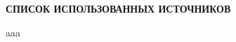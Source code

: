 \begin{center}
	{\bfseries\large СПИСОК ИСПОЛЬЗОВАННЫХ ИСТОЧНИКОВ}
\end{center}

\begingroup
\renewcommand{\section}[2]{}
\begin{thebibliography}{}
	 aaa
\end{thebibliography}
\endgroup

\pagebreak
